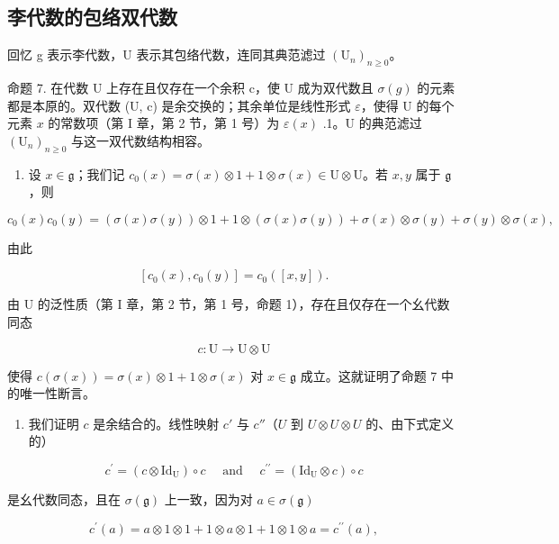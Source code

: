 \subsection{李代数的包络双代数}

回忆 g 表示李代数，U 表示其包络代数，连同其典范滤过 \((\mathrm{U}_{n})_{n\geqslant0}\)。

命题 7. 在代数 U 上存在且仅存在一个余积 c，使 U 成为双代数且 \(\sigma(g)\) 的元素都是本原的。双代数 (U, c) 是余交换的；其余单位是线性形式 \(\varepsilon\)，使得 U 的每个元素 \(x\) 的常数项（第 I 章，第 2 节，第 1 号）为 \(\varepsilon(x)\) .1。U 的典范滤过 \((\mathrm{U}_n)_{n\geqslant 0}\) 与这一双代数结构相容。

\begin{enumerate}
\def\labelenumi{(\alph{enumi})}
\tightlist
\item
  设 \(x \in \mathfrak{g}\)；我们记 \(c_0(x) = \sigma(x) \otimes 1 + 1 \otimes \sigma(x) \in \mathrm{U} \otimes \mathrm{U}\)。若 \(x, y\) 属于 \(\mathfrak{g}\)，则
\end{enumerate}

\[
c _ {0} (x) c _ {0} (y) = (\sigma (x) \sigma (y)) \otimes 1 + 1 \otimes (\sigma (x) \sigma (y)) + \sigma (x) \otimes \sigma (y) + \sigma (y) \otimes \sigma (x),
\]

由此

\[
[ c _ {0} (x), c _ {0} (y) ] = c _ {0} ([ x, y ]).
\]

由 U 的泛性质（第 I 章，第 2 节，第 1 号，命题 1），存在且仅存在一个幺代数同态

\[
c \colon \mathrm{U} \to \mathrm{U} \otimes \mathrm{U}
\]

使得 \(c(\sigma(x)) = \sigma(x) \otimes 1 + 1 \otimes \sigma(x)\) 对 \(x \in \mathfrak{g}\) 成立。这就证明了命题 7 中的唯一性断言。

\begin{enumerate}
\def\labelenumi{(\alph{enumi})}
\setcounter{enumi}{1}
\tightlist
\item
  我们证明 \(c\) 是余结合的。线性映射 \(c'\) 与 \(c''\)（\(U\) 到 \(U \otimes U \otimes U\) 的、由下式定义的）
\end{enumerate}

\[
c ^ {\prime} = (c \otimes \mathrm{Id} _ {\mathrm{U}}) \circ c \quad \text { and } \quad c ^ {\prime \prime} = (\mathrm{Id} _ {\mathrm{U}} \otimes c) \circ c
\]

是幺代数同态，且在 \(\sigma (\mathfrak{g})\) 上一致，因为对 \(a\in \sigma (\mathfrak{g})\)

\[
c ^ {\prime} (a) = a \otimes 1 \otimes 1 + 1 \otimes a \otimes 1 + 1 \otimes 1 \otimes a = c ^ {\prime \prime} (a),
\]

